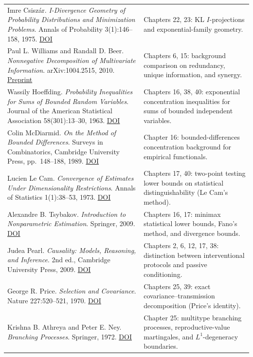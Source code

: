 \documentclass[
  english,
  11pt,
  oneside]{book}
\begin{document}
{\begin{longtable}[]{@{}
  >{\raggedright\arraybackslash}p{}
  >{\raggedright\arraybackslash}p{}@{}}
Imre Csiszár. \emph{I-Divergence Geometry of Probability Distributions and Minimization Problems}. Annals of Probability 3(1):146--158, 1975. \href{https://doi.org/10.1214/aop/1176996454}{DOI} & Chapters 22, 23: KL \(I\)-projections and exponential-family geometry. \\
Paul L. Williams and Randall D. Beer. \emph{Nonnegative Decomposition of Multivariate Information}. arXiv:1004.2515, 2010. \href{https://arxiv.org/abs/1004.2515}{Preprint} & Chapters 6, 15: background comparison on redundancy, unique information, and synergy. \\
Wassily Hoeffding. \emph{Probability Inequalities for Sums of Bounded Random Variables}. Journal of the American Statistical Association 58(301):13--30, 1963. \href{https://doi.org/10.1080/01621459.1963.10500830}{DOI} & Chapters 16, 38, 40: exponential concentration inequalities for sums of bounded independent variables. \\
Colin McDiarmid. \emph{On the Method of Bounded Differences}. Surveys in Combinatorics, Cambridge University Press, pp.~148--188, 1989. \href{https://doi.org/10.1017/CBO9781107359949.008}{DOI} & Chapter 16: bounded-differences concentration background for empirical functionals. \\
Lucien Le Cam. \emph{Convergence of Estimates Under Dimensionality Restrictions}. Annals of Statistics 1(1):38--53, 1973. \href{https://doi.org/10.1214/aos/1176342362}{DOI} & Chapters 17, 40: two-point testing lower bounds on statistical distinguishability (Le Cam's method). \\
Alexandre B. Tsybakov. \emph{Introduction to Nonparametric Estimation}. Springer, 2009. \href{https://doi.org/10.1007/b13794}{DOI} & Chapters 16, 17: minimax statistical lower bounds, Fano's method, and divergence bounds. \\
Judea Pearl. \emph{Causality: Models, Reasoning, and Inference}. 2nd ed., Cambridge University Press, 2009. \href{https://doi.org/10.1017/CBO9780511803161}{DOI} & Chapters 2, 6, 12, 17, 38: distinction between interventional protocols and passive conditioning. \\
George R. Price. \emph{Selection and Covariance}. Nature 227:520--521, 1970. \href{https://doi.org/10.1038/227520a0}{DOI} & Chapters 25, 39: exact covariance--transmission decomposition (Price's identity). \\
Krishna B. Athreya and Peter E. Ney. \emph{Branching Processes}. Springer, 1972. \href{https://doi.org/10.1007/978-3-642-65371-1}{DOI} & Chapter 25: multitype branching processes, reproductive-value martingales, and \(L^1\)-degeneracy boundaries. \\

\end{longtable}}
\end{document}
